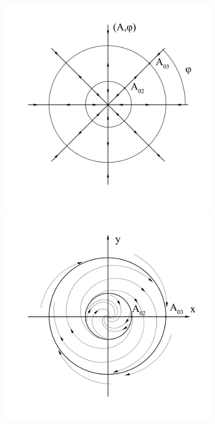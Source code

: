 \begin{figure}[h!]
	\centering
    \begin{minipage}{0.49\linewidth}
        \includegraphics[width=\linewidth]{photo/pics/Ris1.png} 
        \caption{} 
        \label{fig:1}
    \end{minipage}
\hfill     
    \begin{minipage}{0.49\linewidth}
        \centering
        \includegraphics[width=\linewidth]{photo/pics/Ris2.png}
        \caption{} 
        \label{fig:2}
    \end{minipage}
\end{figure} 

